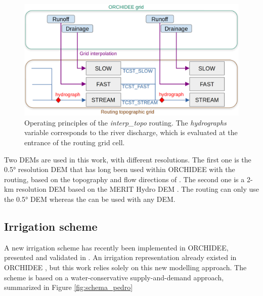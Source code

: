 \begin{figure}[ht]
    \centering
    \includegraphics[width=1\linewidth]{images/routing_structure.png}
    \caption{Operating principles of the \textit{interp\_topo} routing. The \textit{hydrographs} variable corresponds to the river discharge, which is evaluated at the entrance of the routing grid cell.}
    \label{fig:routing_principles}
\end{figure}

Two DEMs are used in this work, with different resolutions. 
The first one is the 0.5° resolution DEM that has long been used within ORCHIDEE with the \std routing, based on the topography and flow directions of \citet{vorosmarty_geomorphometric_2000}.
The second one is a 2-km resolution DEM based on the MERIT Hydro DEM \citep{yamazaki_merit_2019}.
The \std routing can only use the 0.5° DEM whereas the \native can be used with any DEM.


\subsection{Irrigation scheme}

A new irrigation scheme has recently been implemented in ORCHIDEE, presented and validated in \citet{arboleda-obando_validation_2024}. An irrigation representation already existed in ORCHIDEE \citep{de_rosnay_integrated_2003, guimberteau_global_2012}, but this work relies solely on this new modelling approach. The scheme is based on a water-conservative supply-and-demand approach, summarized in Figure \ref{fig:schema_pedro}

